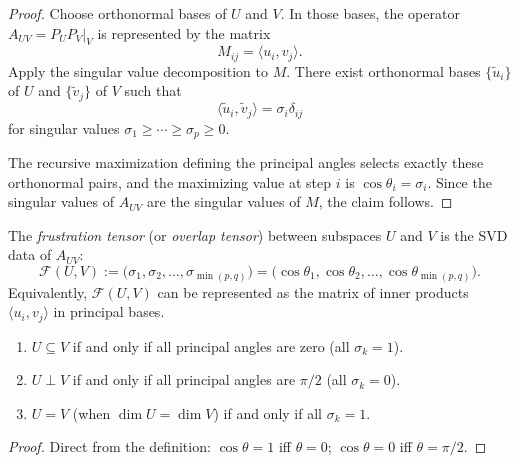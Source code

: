 \begin{proof}
Choose orthonormal bases of \(U\) and \(V\). In those bases, the operator
\(A_{UV} = P_U P_V|_V\) is represented by the matrix
\[
M_{ij} = \langle u_i, v_j \rangle .
\]
Apply the singular value decomposition to \(M\). There exist orthonormal bases
\(\{\tilde u_i\}\) of \(U\) and \(\{\tilde v_j\}\) of \(V\) such that
\[
\langle \tilde u_i,\tilde v_j\rangle = \sigma_i \delta_{ij}
\]
for singular values \(\sigma_1 \ge \cdots \ge \sigma_p \ge 0\).

The recursive maximization defining the principal angles selects exactly these
orthonormal pairs, and the maximizing value at step \(i\) is
\(\cos\theta_i = \sigma_i\). Since the singular values of \(A_{UV}\) are the
singular values of \(M\), the claim follows.
\end{proof}

\begin{definition}
\label{def:frustration-tensor}
The \emph{frustration tensor} (or \emph{overlap tensor}) between subspaces $U$ and $V$ is the SVD data of $A_{UV}$:
\[
\mathcal{F}(U, V) := \bigl( \sigma_1, \sigma_2, \ldots, \sigma_{\min(p,q)} \bigr) = \bigl( \cos\theta_1, \cos\theta_2, \ldots, \cos\theta_{\min(p,q)} \bigr).
\]
Equivalently, $\mathcal{F}(U,V)$ can be represented as the matrix of inner products $\langle u_i, v_j \rangle$ in principal bases.
\end{definition}

\begin{corollary}
\label{cor:principal-extremes}
\begin{enumerate}[label=(\roman*)]
\item $U \subseteq V$ if and only if all principal angles are zero (all $\sigma_k = 1$).
\item $U \perp V$ if and only if all principal angles are $\pi/2$ (all $\sigma_k = 0$).
\item $U = V$ (when $\dim U = \dim V$) if and only if all $\sigma_k = 1$.
\end{enumerate}
\end{corollary}

\begin{proof}
Direct from the definition: $\cos\theta = 1$ iff $\theta = 0$; $\cos\theta = 0$ iff $\theta = \pi/2$.
\end{proof}

